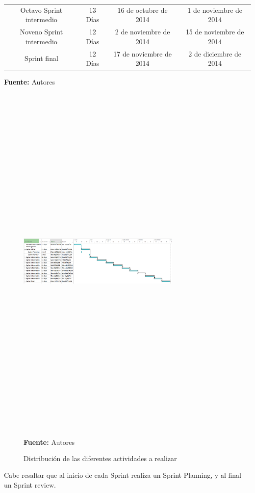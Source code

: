 \begin{table}[h]
\begin{center}
{\begin{tabular}{|llll|}
        \multicolumn{1}{|c}{Octavo Sprint intermedio} & \multicolumn{1}{c}{13 Días} & \multicolumn{1}{c}{16 de octubre de 2014} & \multicolumn{1}{c|}{1 de noviembre de 2014} \\ 
        \multicolumn{1}{|c}{Noveno Sprint intermedio} & \multicolumn{1}{c}{12 Días} & \multicolumn{1}{c}{2 de noviembre de 2014} & \multicolumn{1}{c|}{15 de noviembre de 2014} \\ 
        \multicolumn{1}{|c}{Sprint final} & \multicolumn{1}{c}{12 Días} & \multicolumn{1}{c}{17 de noviembre de 2014} & \multicolumn{1}{c|}{2 de diciembre de 2014} \\ 
        \hline
      \end{tabular}
      }
      \textbf{Fuente:} Autores
  \end{center}
\end{table}

\begin{figure}
  \begin{center}
    \includegraphics[angle=90,height=18cm,width=8cm]{./imagenes/cronograma_completo.PNG}
    \caption{Distribución de las diferentes actividades a realizar}
    \label{fig:cronograma}
    \textbf{Fuente:} Autores
  \end{center}
\end{figure}

Cabe resaltar que al inicio de cada Sprint realiza un Sprint Planning, y al final un Sprint review.
